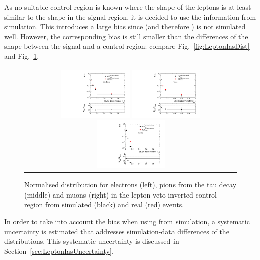 As no suitable control region is known where the \ias shape of the leptons is at least similar to the shape in the signal region, it is decided to use the \ias information from simulation.
This introduces a large bias since \dedx (and therefore \ias) is not simulated well.
However, the corresponding bias is still smaller than the differences of the \ias shape between the signal and a control region: compare Fig.~\ref{fig:LeptonIasDist} and Fig.~\ref{fig:LeptonIasDistData}.
\begin{figure}[!tb]
  \centering 
  \begin{tabular}{c}
    \includegraphics[width=0.33\textwidth]{figures/analysis/Background/hASmi_Electrons_MCCR_DataCR.pdf}
    \includegraphics[width=0.33\textwidth]{figures/analysis/Background/hASmi_Taus_MCCR_DataCR.pdf}
    \includegraphics[width=0.33\textwidth]{figures/analysis/Background/hASmi_Muons_MCCR_DataCR.pdf}
  \end{tabular}
  \caption{Normalised \ias distribution for electrons (left), pions from the tau decay (middle) and muons (right) in the lepton veto inverted control region from simulated (black) and real (red) events.}
  \label{fig:LeptonIasDistData}
\end{figure}

In order to take into account the bias when using \ias from simulation, a systematic uncertainty is estimated that addresses simulation-data differences of the \ias distributions.
This systematic uncertainty is discussed in Section~\ref{sec:LeptonIasUncertainty}.
